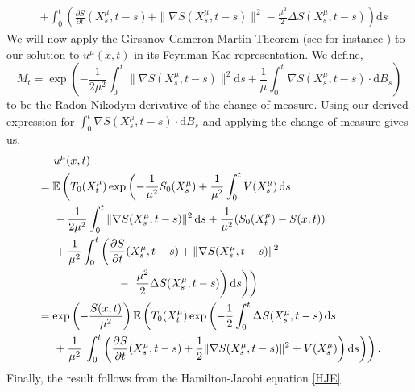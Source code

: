 \documentclass[a4paper,12pt,draft]{report}
\begin{document}
{\begin{align}
& + \int _0^t\left(\frac{\partial S}{\partial t}(X^{\mu}_{s}, t - s) + \|\nabla S(X^{\mu}_{s}, t - s)\|^2 - \frac{\mu^2}{2}\Delta S(X^{\mu}_{s}, t - s)\right)\mathrm{d}s\nonumber
\end{align}
We will now apply the Girsanov-Cameron-Martin Theorem (see for instance \cite{Oksendal}) to our solution to $u^\mu(x, t)$ in its Feynman-Kac representation.  We define,
$$
M_t = \exp\left(-\frac{1}{2\mu^2}\int _0^t \|\nabla S(X^{\mu}_{s}, t - s)\|^2 \mathrm{d}s + \frac{1}{\mu}\int _0^t \nabla S(X^{\mu}_{s}, t - s)\cdot \mathrm{d}B_s\right)
$$
to be the Radon-Nikodym derivative of the change of measure.  Using our derived expression for $\int _0^t\nabla S(X^{\mu}_{s}, t - s)\cdot\mathrm{d}B_{s}$ and applying the change of measure gives us,
\begin{align}
& \hspace{0.5cm} u^\mu(x, t)\nonumber\\
& = \mathbb{E}\left(T_{0}(X^{\mu}_{t})\exp\left(-\frac{1}{\mu^2}S_{0}(X^{\mu}_{s}) + \frac{1}{\mu^2}\int_0^t V(X^{\mu}_{s})\,\mathrm{d}s\right.\right. \nonumber\\
& \hspace{0.5cm} - \frac{1}{2\mu^2}\int _0^t \|\nabla S(X^{\mu}_{s}, t - s)\|^2\,\mathrm{d}s + \frac{1}{\mu^2}(S_{0}(X^{\mu}_{t}) - S(x, t))\nonumber\\
& \hspace{0.5cm} + \frac{1}{\mu^2}\int _0^t\left(\frac{\partial S}{\partial t}(X^{\mu}_{s}, t - s) + \|\nabla S(X^{\mu}_{s}, t - s)\|^2\right.\nonumber\\
& \hspace{2.5cm} - \left.\left.\left.\frac{\mu^2}{2}\Delta S(X^{\mu}_{s}, t - s)\right)\mathrm{d}s\right)\right)\nonumber\\
& = \exp\left(-\frac{S(x, t)}{\mu^2}\right)\mathbb{E}\left(T_{0}(X^{\mu}_{t})\exp\left( - \frac{1}{2}\int_0^t \Delta S(X^{\mu}_{s}, t - s)\,\mathrm{d}s\right.\right.\nonumber \\
& \hspace{0.5cm} + \frac{1}{\mu^2}\left.\left.\int _0^t\left(\frac{\partial S}{\partial t}(X^{\mu}_{s}, t - s) + \frac{1}{2}\|\nabla S(X^{\mu}_{s}, t - s)\|^2 + V(X^{\mu}_{s})\right)\mathrm{d}s\right)\right).\nonumber
\end{align}
Finally, the result follows from the Hamilton-Jacobi equation \eqref{HJE}.

\qedhere
}
\end{document}
